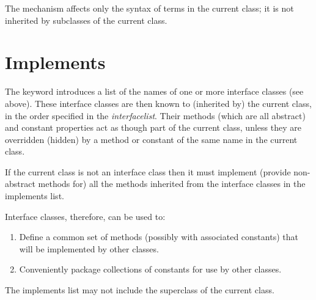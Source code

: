 The  mechanism affects only the syntax of terms in the
current class; it is not inherited by subclasses of the current class.
\section{Implements}
 
The  keyword introduces a list of the names of one or
more interface classes (see above).
These interface classes are then known to (inherited by) the current
class, in the order specified in the \emph{interfacelist}.
Their methods (which are all abstract) and constant properties act as
though part of the current class, unless they are overridden (hidden) by
a method or constant of the same name in the current class.
 
If the current class is not an interface class then it must implement
(provide non-abstract methods for) all the methods inherited from the
interface classes in the implements list.
 
Interface classes, therefore, can be used to:
\begin{enumerate}
\item Define a common set of methods (possibly with associated constants)
that will be implemented by other classes.
\item Conveniently package collections of constants for use by other
classes.
\end{enumerate}
 
The implements list may not include the superclass of the current class.
\index{,}
